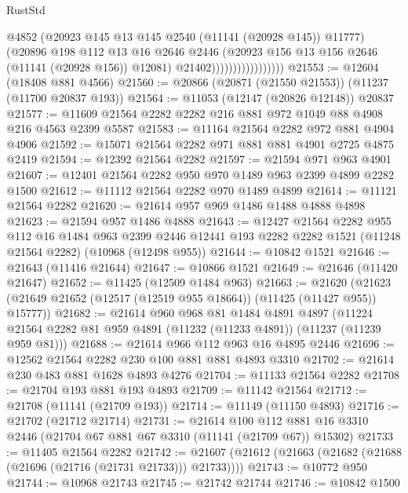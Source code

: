 \begin{lexlean}{RustStd}
\begin{coremodule}
                                    @4852
                                    (@20923 @145 @13 @145 @2540 (@11141 (@20928 @145)) @11777)
                                    (@20896
                                      @198
                                      @112
                                      @13
                                      @16
                                      @2646
                                      @2446
                                      (@20923 @156 @13 @156 @2646 (@11141 (@20928 @156)) @12081)
                                      @21402)))))))))))))))))
@21553 := @12604 (@18408 @881 @4566)
@21560 := @20866 (@20871 (@21550 @21553)) (@11237 (@11700 @20837 @193))
@21564 := @11053 (@12147 (@20826 @12148)) @20837
@21577 := @11609 @21564 @2282 @2282 @216 @881 @972 @1049 @88 @4908 @216 @4563 @2399 @5587
@21583 := @11164 @21564 @2282 @972 @881 @4904 @4906
@21592 := @15071 @21564 @2282 @971 @881 @881 @4901 @2725 @4875 @2419
@21594 := @12392 @21564 @2282
@21597 := @21594 @971 @963 @4901
@21607 := @12401 @21564 @2282 @950 @970 @1489 @963 @2399 @4899 @2282 @1500
@21612 := @11112 @21564 @2282 @970 @1489 @4899
@21614 := @11121 @21564 @2282
@21620 := @21614 @957 @969 @1486 @1488 @4888 @4898
@21623 := @21594 @957 @1486 @4888
@21643 := @12427
    @21564
    @2282
    @955
    @112
    @16
    @1484
    @963
    @2399
    @2446
    @12441
    @193
    @2282
    @2282
    @1521
    (@11248 @21564 @2282)
    (@10968 (@12498 @955))
@21644 := @10842 @1521
@21646 := @21643 (@11416 @21644)
@21647 := @10866 @1521
@21649 := @21646 (@11420 @21647)
@21652 := @11425 (@12509 @1484 @963)
@21663 := @21620
    (@21623 (@21649 @21652 (@12517 (@12519 @955 @18664)) (@11425 (@11427 @955)) @15777))
@21682 := @21614
    @960
    @968
    @81
    @1484
    @4891
    @4897
    (@11224 @21564 @2282 @81 @959 @4891 (@11232 (@11233 @4891)) (@11237 (@11239 @959 @81)))
@21688 := @21614 @966 @112 @963 @16 @4895 @2446
@21696 := @12562 @21564 @2282 @230 @100 @881 @881 @4893 @3310
@21702 := @21614 @230 @483 @881 @1628 @4893 @4276
@21704 := @11133 @21564 @2282
@21708 := @21704 @193 @881 @193 @4893
@21709 := @11142 @21564
@21712 := @21708 (@11141 (@21709 @193))
@21714 := @11149 (@11150 @4893)
@21716 := @21702 (@21712 @21714)
@21731 := @21614
    @100
    @112
    @881
    @16
    @3310
    @2446
    (@21704 @67 @881 @67 @3310 (@11141 (@21709 @67)) @15302)
@21733 := @11405 @21564 @2282
@21742 := @21607 (@21612 (@21663 (@21682 (@21688 (@21696 (@21716 (@21731 @21733))) @21733))))
@21743 := @10772 @950
@21744 := @10968 @21743
@21745 := @21742 @21744
@21746 := @10842 @1500

\end{coremodule}
\end{lexlean}

